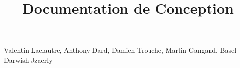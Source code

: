 \documentclass[12pt, a4paper, one side]{article}
\title{Documentation de Conception}
\author{}
\date{}
\begin{document}
\maketitle

\begin{center}
    Valentin Laclautre, Anthony Dard, Damien Trouche, Martin Gangand, Basel Darwish Jzaerly
\end{center}

\tableofcontents
\end{document}
